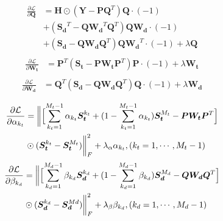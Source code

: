 \documentclass{article}
\begin{document}
\begin{equation} %
\begin{split}
\frac {\partial \mathcal{L}}{\partial \bm{Q}} &=\bm{H}\odot(\bm{Y}-\bm{P}\bm{Q}^T)\bm{Q}\cdot(-1)\\
&+ (\bm{S_d}^T-\bm{Q}\bm{W_d}^T\bm{Q}^T)\bm{Q}\bm{W_d}\cdot(-1)\\
&+ (\bm{S_d}-\bm{Q}\bm{W_d}\bm{Q}^T)\bm{Q}\bm{W_d}^T\cdot(-1) + \lambda \bm{Q}\\
\end{split}
\end{equation}
\begin{equation} %
\begin{split}
\frac {\partial \mathcal{L}}{\partial \bm{W_t}} &=\bm{P}^T(\bm{S_t}-\bm{P}\bm{W_t}\bm{P}^T)\bm{P}\cdot(-1)+\lambda \bm{W_t}\\
\end{split}
\end{equation}
\begin{equation} %
\begin{split}
\frac {\partial \mathcal{L}}{\partial \bm{W_d}} &=\bm{Q}^T(\bm{S_d}-\bm{Q}\bm{W_d}\bm{Q}^T)\bm{Q}\cdot(-1)+\lambda \bm{W_d}\\
\end{split}
\end{equation}
\begin{equation} %
\begin{split}
\frac {\partial \mathcal{L}}{\partial \alpha_{k_t}} &=\biggl\|\Bigl[\sum_{k_t=1}^{M_t-1}{\alpha_{k_t}}\bm{S_t}^{k_t}+(1-\sum_{k_t=1}^{M_t-1}{\alpha_{k_t}})\bm{S_t}^{M_t}-\bm{P}\bm{W_t}\bm{P}^T\Bigr]\\
&\odot(\bm{S_t}^{k_t}-\bm{S_t}^{M_t})\biggr\|_F^2+\lambda_\alpha \alpha_{k_t} , (k_t=1,\cdots, M_t-1)
\end{split}
\end{equation}
\begin{equation} %
\begin{split}
\frac {\partial \mathcal{L}}{\partial \beta_{k_d}} &=\biggl\|\Bigl[\sum_{k_d=1}^{M_d-1}{\beta_{k_d}}\bm{S_d}^{k_d}+(1-\sum_{k_d=1}^{M_d-1}{\beta_{k_d}})\bm{S_d}^{M_d}-\bm{Q}\bm{W_d}\bm{Q}^T\Bigr]\\
&\odot(\bm{S_d}^{k_d}-\bm{S_d}^{Md})\biggr\|_F^2+\lambda_\beta \beta_{k_d} , (k_d=1,\cdots, M_d-1)
\end{split}
\end{equation}
\end{document}
